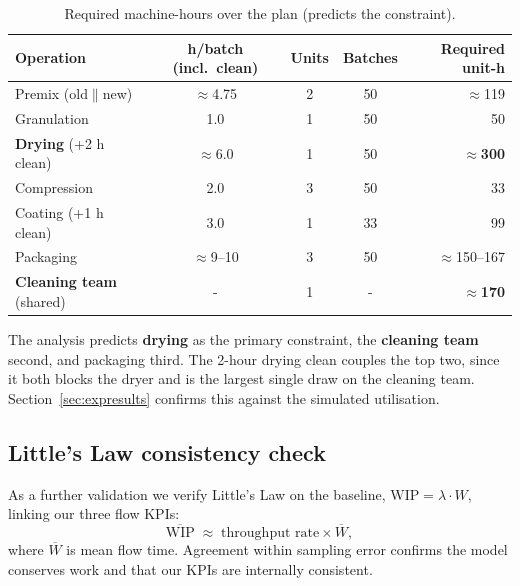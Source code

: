\begin{table}[H]
\centering
\caption{Required machine-hours over the plan (predicts the constraint).}
\label{tab:capacity}
\begin{tabularx}{\textwidth}{l c c c r}
\toprule
Operation & h/batch (incl.\ clean) & Units & Batches & Required unit-h \\
\midrule
Premix (old$\parallel$new)   & $\approx$4.75 & 2 & 50 & $\approx$119 \\
Granulation                  & 1.0  & 1 & 50 & 50 \\
\textbf{Drying} (+2 h clean) & $\approx$6.0 & 1 & 50 & \textbf{$\approx$300} \\
Compression                  & 2.0  & 3 & 50 & 33 \\
Coating (+1 h clean)         & 3.0  & 1 & 33 & 99 \\
Packaging                    & $\approx$9--10 & 3 & 50 & $\approx$150--167 \\
\textbf{Cleaning team} (shared) & - & 1 & - & \textbf{$\approx$170} \\
\bottomrule
\end{tabularx}
\end{table}

The analysis predicts \textbf{drying} as the primary constraint, the
\textbf{cleaning team} second, and packaging third. The 2-hour drying clean
couples the top two, since it both blocks the dryer and is the largest single
draw on the cleaning team. Section~\ref{sec:expresults} confirms this against
the simulated utilisation.

\subsection{Little's Law consistency check}
\label{sec:little}
As a further validation we verify Little's Law on the baseline,
$\text{WIP} = \lambda \cdot W$, linking our three flow KPIs:
\begin{equation}
  \overline{\text{WIP}} \;\approx\; \text{throughput rate} \times \overline{W},
  \label{eq:little}
\end{equation}
where $\overline{W}$ is mean flow time. Agreement within sampling error confirms
the model conserves work and that our KPIs are internally consistent.
